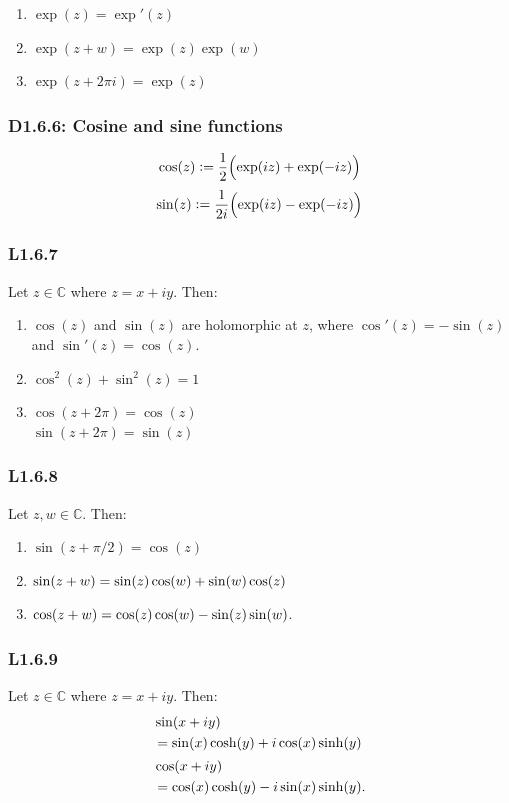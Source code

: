\documentclass{article}
\newcommand{\deq}{\vcentcolon=}
\begin{document}
\begin{multicols*}{3}
\begin{enumerate}
    \item $\exp(z)=\exp'(z)$

    \item $\exp(z+w)=\exp(z)\exp(w)$
    
    \item $\exp(z+2\pi i)=\exp(z)$
\end{enumerate}

\subsubsection*{D1.6.6: Cosine and sine functions}
$$\cos(z)\deq\frac{1}{2}\Bigl(\exp(iz)+\exp(-iz)\Bigr)$$
$$\sin(z)\deq\frac{1}{2i}\Bigl(\exp(iz)-\exp(-iz)\Bigr)$$

\subsubsection*{L1.6.7}
Let $z\in\mathbb{C}$ where $z=x+iy$. Then:
\begin{enumerate}
    \item $\cos(z)$ and $\sin(z)$ are holomorphic at $z$,
    where $\cos'(z)=-\sin(z)$ and $\sin'(z)=\cos(z)$.

    \item $\cos^2(z)+\sin^2(z)=1$
    
    \item $\cos(z+2\pi)=\cos(z)$ \\
    $\sin(z+2\pi)=\sin(z)$
\end{enumerate}

\subsubsection*{L1.6.8}
Let $z,w\in\mathbb{C}$. Then:
\begin{enumerate}
    \item $\sin(z+\pi/2)=\cos(z)$
    
    \item $\sin(z+w) \\
    =\sin(z)\cos(w)+\sin(w)\cos(z)$

    \item $\cos(z+w) \\
    =\cos(z)\cos(w)-\sin(z)\sin(w)$.
\end{enumerate}

\subsubsection*{L1.6.9}
Let $z\in\mathbb{C}$ where $z=x+iy$. Then:
\begin{align*}
    &\sin(x+iy) \\
    &=\sin(x)\cosh(y)+i\cos(x)\sinh(y)
    \newline \\[0.025in]
    &\cos(x+iy) \\
    &=\cos(x)\cosh(y)-i\sin(x)\sinh(y).
\end{align*}


\end{multicols*}
\end{document}
